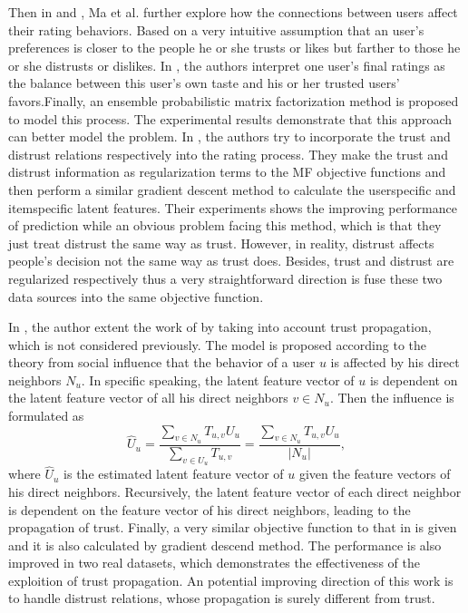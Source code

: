 Then in \cite{ma2009llearningEnsembel} and \cite{ma2009learningTrust}, Ma et al. further explore how the connections between users affect their rating behaviors. Based on a very intuitive assumption that an user's preferences is closer to the people he or she trusts or likes but farther to those he or she distrusts or dislikes. In \cite{ma2009llearningEnsembel}, the authors interpret one user's final ratings as the balance between this user's own taste and his or her trusted users' favors.Finally, an ensemble probabilistic matrix factorization method is proposed to model this process. The experimental results demonstrate that this approach can better model the problem. In \cite{ma2009learningTrust}, the authors try to incorporate the trust and distrust relations respectively into the rating process. They make the trust and distrust information as regularization terms to the MF objective functions and then perform a similar gradient descent method to calculate the user\-specific and item\-specific latent features. Their experiments shows the improving performance of prediction while an obvious problem facing this method, which is that they just treat distrust the same way as trust. However, in reality, distrust affects people's decision not the same way as trust does. Besides, trust and distrust are regularized respectively thus a very straightforward direction is fuse these two data sources into the same objective function. 

In \cite{jamali2010matrix}, the author extent the work of \cite{ma2009llearningEnsembel} by taking into account trust propagation, which is not considered previously. The model is proposed according to the theory from social influence that the behavior of a user $u$ is affected by his direct neighbors $N_u$. In specific speaking, the latent feature vector of $u$ is dependent on the latent feature vector of all his direct neighbors $v \in N_u$. Then the influence is formulated as 
\begin{equation}
\widehat{U}_u = \frac{\sum_{v \in N_u} T_{u,v}U_u}{\sum_{v \in U_u}T_{u,v}} = \frac{\sum_{v \in N_u} T_{u,v}U_u}{|N_u|},
\end{equation}
where $\widehat{U}_u$ is the estimated latent feature vector of $u$ given the feature vectors of his direct neighbors. Recursively, the latent feature vector of each direct neighbor is dependent on the feature vector of his direct neighbors, leading to the propagation of trust. Finally, a very similar objective function to that in \cite{ma2009learningTrust} is given and it is also calculated by gradient descend method. The performance is also improved in two real datasets, which demonstrates the effectiveness of the exploition of trust propagation. An potential improving direction of this work is to handle distrust relations, whose propagation is surely different from trust.

